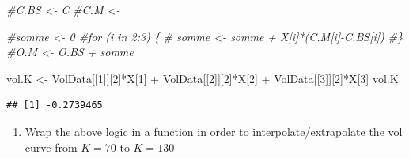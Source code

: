 \documentclass[
]{article}
\newenvironment{Shaded}{\begin{snugshade}}{\end{snugshade}}
\newcommand{\CommentTok}[1]{\textcolor[rgb]{0.56,0.35,0.01}{\textit{#1}}}
\newcommand{\DecValTok}[1]{\textcolor[rgb]{0.00,0.00,0.81}{#1}}
\newcommand{\NormalTok}[1]{#1}
\newcommand{\OtherTok}[1]{\textcolor[rgb]{0.56,0.35,0.01}{#1}}
\newcommand{\SpecialCharTok}[1]{\textcolor[rgb]{0.00,0.00,0.00}{#1}}
\providecommand{\tightlist}{%
  \setlength{\itemsep}{0pt}\setlength{\parskip}{0pt}}
\begin{document}
\begin{Shaded}
\begin{Highlighting}[]
\CommentTok{\#C.BS \textless{}{-} C}
\CommentTok{\#C.M \textless{}{-} }

\CommentTok{\#somme \textless{}{-} 0}
\CommentTok{\#for (i in 2:3) \{}
\CommentTok{\#  somme \textless{}{-} somme + X[i]*(C.M[i]{-}C.BS[i])}
\CommentTok{\#\}}
\CommentTok{\#O.M \textless{}{-} O.BS + somme}

\NormalTok{vol.K }\OtherTok{\textless{}{-}}\NormalTok{ VolData[[}\DecValTok{1}\NormalTok{]][}\DecValTok{2}\NormalTok{]}\SpecialCharTok{*}\NormalTok{X[}\DecValTok{1}\NormalTok{] }\SpecialCharTok{+}\NormalTok{ VolData[[}\DecValTok{2}\NormalTok{]][}\DecValTok{2}\NormalTok{]}\SpecialCharTok{*}\NormalTok{X[}\DecValTok{2}\NormalTok{] }\SpecialCharTok{+}\NormalTok{ VolData[[}\DecValTok{3}\NormalTok{]][}\DecValTok{2}\NormalTok{]}\SpecialCharTok{*}\NormalTok{X[}\DecValTok{3}\NormalTok{]}
\NormalTok{vol.K}
\end{Highlighting}
\end{Shaded}

\begin{verbatim}
## [1] -0.2739465
\end{verbatim}

\begin{enumerate}
\def\labelenumi{\arabic{enumi}.}
\setcounter{enumi}{5}
\tightlist
\item
  Wrap the above logic in a function in order to interpolate/extrapolate
  the vol curve from \(K=70\) to \(K=130\)
\end{enumerate}
\end{document}
